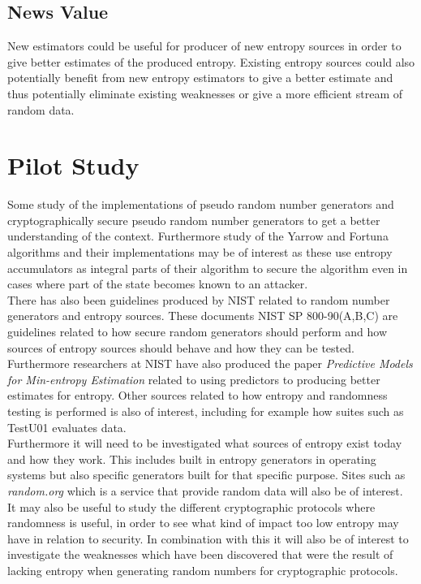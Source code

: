 \documentclass[a4paper,11pt]{report}
\begin{document}
\subsection*{News Value}
New estimators could be useful for producer of new entropy sources in order to
give better estimates of the produced entropy. Existing entropy sources could
also potentially benefit from new entropy estimators to give a better estimate
and thus potentially eliminate existing weaknesses or give a more efficient 
stream of random data.

\section*{Pilot Study}
Some study of the implementations of pseudo random number generators and
cryptographically secure pseudo random number generators to get a better
understanding of the context. Furthermore study of the Yarrow and
Fortuna algorithms and their implementations may be of interest as these 
use entropy accumulators as integral parts of their algorithm to secure the 
algorithm even in cases where part of the state becomes known to an attacker.
\\

\noindent
There has also been guidelines produced by NIST related to random number
generators and entropy sources. These documents NIST SP 800-90(A,B,C) 
\cite{800-90A}\cite{800-90B}\cite{800-90C} are guidelines related to 
how secure random generators should perform and how sources of entropy 
sources should behave and how they can be tested.
Furthermore researchers at NIST have also produced 
the paper \textit{Predictive Models for Min-entropy Estimation}
\cite{eprint-2015-26658}
related to using predictors to producing better estimates for entropy.
Other sources related to how entropy and randomness testing is performed is
also of interest, including for example how suites such as TestU01\cite{Ecuyer2007} evaluates
data.
\\

\noindent
Furthermore it will need to be investigated what sources of entropy exist today
and how they work. This includes built in entropy generators in operating 
systems but also specific generators built for that specific purpose. Sites
such as \textit{random.org}\cite{haahr2010random} which is a service that 
provide random data will also be of interest.
\\

\noindent
It may also be useful to study the different cryptographic protocols 
where randomness is useful, in order to see what kind of impact too low entropy 
may have in relation to security. In combination with this it will also be 
of interest to investigate the weaknesses which have been discovered that were 
the result of lacking entropy when generating random numbers for cryptographic 
protocols.
\end{document}
